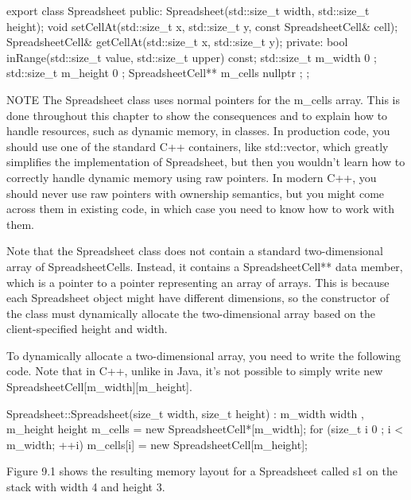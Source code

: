 \begin{cpp}
export class Spreadsheet
{
    public:
        Spreadsheet(std::size_t width, std::size_t height);
        void setCellAt(std::size_t x, std::size_t y, const SpreadsheetCell& cell);
        SpreadsheetCell& getCellAt(std::size_t x, std::size_t y);
    private:
        bool inRange(std::size_t value, std::size_t upper) const;
        std::size_t m_width { 0 };
        std::size_t m_height { 0 };
        SpreadsheetCell** m_cells { nullptr };
};
\end{cpp}

\begin{myNotic}{NOTE}
The Spreadsheet class uses normal pointers for the m\_cells array. This is done throughout this chapter to show the consequences and to explain how to handle resources, such as dynamic memory, in classes. In production code, you should use one of the standard C++ containers, like std::vector, which greatly simplifies the implementation of Spreadsheet, but then you wouldn’t learn how to correctly handle dynamic memory using raw pointers. In modern C++, you should never use raw pointers with ownership semantics, but you might come across them in existing code, in which case you need to know how to work with them.
\end{myNotic}

Note that the Spreadsheet class does not contain a standard two-dimensional array of SpreadsheetCells. Instead, it contains a SpreadsheetCell** data member, which is a pointer to a pointer representing an array of arrays. This is because each Spreadsheet object might have different dimensions, so the constructor of the class must dynamically allocate the two-dimensional array based on the client-specified height and width.

To dynamically allocate a two-dimensional array, you need to write the following code. Note that in C++, unlike in Java, it’s not possible to simply write new SpreadsheetCell[m\_width][m\_height].

\begin{cpp}
Spreadsheet::Spreadsheet(size_t width, size_t height)
: m_width { width }, m_height { height }
{
    m_cells = new SpreadsheetCell*[m_width];
    for (size_t i { 0 }; i < m_width; ++i) {
        m_cells[i] = new SpreadsheetCell[m_height];
    }
}
\end{cpp}

Figure 9.1 shows the resulting memory layout for a Spreadsheet called s1 on the stack with width 4 and height 3.

